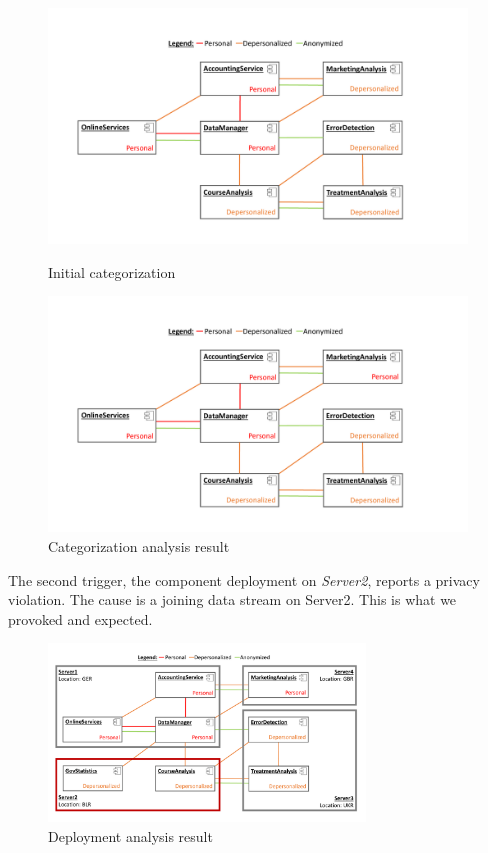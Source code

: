 \begin{figure}[h]
	\centering
	\begin{minipage}[b]{0.48\textwidth}		
		\includegraphics[trim = 20mm 10mm 40mm 10mm, clip, width=0.99\textwidth]{graphs/medSys_eval_pa_tagging_init}
		\caption{Initial categorization}
		\label{fig:eval:pa:base_tag}
	\end{minipage}
	\begin{minipage}[b]{0.48\textwidth}
		\includegraphics[trim = 20mm 10mm 40mm 10mm, clip, width=0.99\textwidth]{graphs/medSys_eval_pa_tagging_analysis}
		\caption{Categorization analysis result}
		\label{fig:eval:pa:categorized}
	\end{minipage}
\end{figure}

The second trigger, the component deployment on \textit{Server2}, reports a privacy violation. The cause is a joining data stream on Server2. This is what we provoked and expected.

\begin{figure}[h]
	\centering
	\includegraphics[trim = 0mm 10mm 0mm 10mm, clip, width=0.75\textwidth]{graphs/medSys_eval_pa_da}
	\caption{Deployment analysis result}
	\label{fig:eval:pa:depl_ana}
\end{figure}

